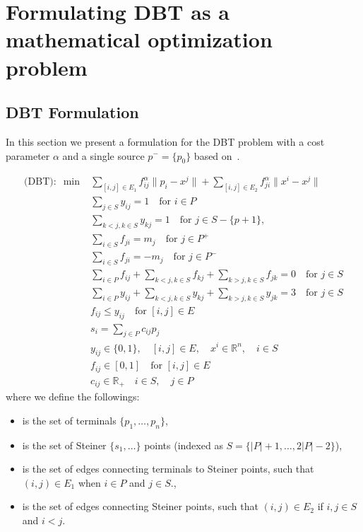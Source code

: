 \documentclass[11pt,reqno,a4paper]{amsart}
\newenvironment{itemizeb}
{\begin{itemize}
     \itemsep=2pt}{
\end{itemize}}
\numberwithin{equation}{section}
\theoremstyle{mytheorem}
\theoremstyle{myremark}
\theoremstyle{myparagraph}
\newcommand{\R}{\mathbb{R}}
\begin{document}
    \section{Formulating DBT as a mathematical optimization problem}




    \subsection{DBT Formulation}

    In this section we present a formulation for the DBT problem with a cost parameter $\alpha$ and a
    single source $p^-=\{p_0\}$ based on~\cite[MMX]{mmx}.

    \begin{align}
        \text{(DBT)}: \; \min &\sum_{[i,j] \in E_1} f_{ij}^{\alpha}\|p_i - x^j\| + \sum_{[i,j] \in E_2} f_{ji}^{\alpha}\|x^i - x^j\| \\
        & \sum_{j \in S} y_{ij} = 1 \quad \text{for } i \in P \\
        & \sum_{k < j, k \in S} y_{kj} = 1 \quad \text{for } j \in S - \{p+1\}, \label{dbt_form:connectedness} \\
        & \sum_{i \in S} f_{ji} = m_j \quad \text{for } j \in P^+ \label{dbt_form:sum_sinks} \\
        & \sum_{i \in S} f_{ji} = -m_j \quad \text{for } j \in P^- \label{dbt_form:sum_sources} \\
        & \sum_{i \in P} f_{ij} + \sum_{k < j, k \in S} f_{kj} + \sum_{k > j, k \in S} f_{jk} = 0 \quad \text{for } j \in S \label{dbt_form:sum_steiner_0}  \\
        & \sum_{i \in P} y_{ij} + \sum_{k < j, k \in S} y_{kj} + \sum_{k > j, k \in S} y_{jk} = 3 \quad \text{for } j \in S \label{dbt_form:degree_bound} \\
        & f_{ij} \le y_{ij} \quad \text{for } [i,j] \in E \\
        & s_i = \sum_{j \in P} c_{ij} p_j \\
        & y_{ij} \in \{0, 1\}, \quad [i, j] \in E, \quad x^i \in \mathbb{R}^n, \quad i \in S \\
        & f_{ij} \in [0,1] \quad \text{for } [i,j] \in E\\
        & c_{ij} \in \R_+ \quad i \in S, \quad j \in P
    \end{align}
     where we define the followings:

    \begin{itemizeb}
         cm=.3 cm
        \item [$P$] is the set of terminals $\{p_1, \ldots, p_n\}$,
        \item [$S$] is the set of Steiner $\{s_1, \ldots\}$ points (indexed as $S = \{|P| + 1, \dots, 2|P|-2\}$),
        \item [$E_1$] is the set of edges connecting terminals to Steiner points, such that $(i,j) \in E_1$ when $i \in P$ and $j \in S$.,
        \item [$E_2$] is the set of edges connecting Steiner points, such that $(i,j) \in E_2$ if $i,j \in S$ and $i < j$.
    \end{itemizeb}
\end{document}
